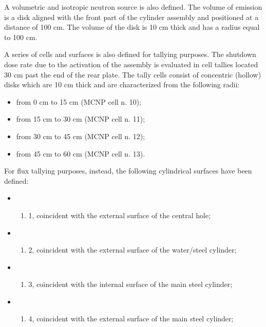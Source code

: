 \documentclass[letterpaper,10pt,english]{sphinxmanual}
\begin{document}
A volumetric and isotropic neutron source is also defined. The volume of
emission is a disk aligned with the front part of the cylinder assembly and
positioned at a distance of 100 cm. The volume of the disk is 10 cm thick and
has a radius equal to 100 cm.

A series of cells and surfaces is also defined for tallying purposes.
The shutdown dose rate due to the activation of the assembly is evaluated in cell
tallies located 30 cm past the end of the rear plate. The tally cells consist of
concentric (hollow) disks which are 10 cm thick and are characterized from the
following radii:
\begin{itemize}
\item {} 
from 0 cm to 15 cm (MCNP cell n. 10);

\item {} 
from 15 cm to 30 cm (MCNP cell n. 11);

\item {} 
from 30 cm to 45 cm (MCNP cell n. 12);

\item {} 
from 45 cm to 60 cm (MCNP cell n. 13).

\end{itemize}

For flux tallying purposes, instead, the following cylindrical surfaces have been defined:
\begin{itemize}
\item {} \begin{enumerate}
%
\setcounter{enumi}{13}
\item {} 
1, coincident with the external surface of the central hole;

\end{enumerate}

\item {} \begin{enumerate}
%
\setcounter{enumi}{13}
\item {} 
2, coincident with the external surface of the water/steel cylinder;

\end{enumerate}

\item {} \begin{enumerate}
%
\setcounter{enumi}{13}
\item {} 
3, coincident with the internal surface of the main steel cylinder;

\end{enumerate}

\item {} \begin{enumerate}
%
\setcounter{enumi}{13}
\item {} 
4, coincident with the external surface of the main steel cylinder;

\end{enumerate}

\end{itemize}
\end{document}
